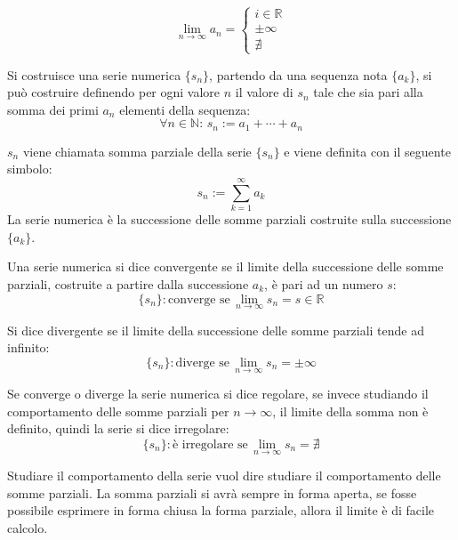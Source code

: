 \documentclass{article}
\numberwithin{equation}{subsection}
\begin{document}
\begin{equation}
    \lim_{n\to\infty}a_n=\begin{cases}
        i\in\mathbb{R}\\
        \pm\infty\\
        \nexists
    \end{cases}
\end{equation}

Si costruisce una serie numerica $\{s_n\}$, partendo da una sequenza nota $\{a_k\}$, si può costruire definendo per ogni valore $n$ il valore di $s_n$ tale che sia pari alla somma dei primi $a_n$ elementi della sequenza:
\begin{equation}
    \forall n\in\mathbb{N}:\,
    s_n:=a_1+\cdots+a_n
\end{equation}

$s_n$ viene chiamata somma parziale della serie $\{s_n\}$ e viene definita con il seguente simbolo:
\begin{equation}
    s_n:=\displaystyle\sum_{k=1}^\infty a_k
\end{equation}
La serie numerica è la successione delle somme parziali costruite sulla successione $\{a_k\}$. 

Una serie numerica si dice convergente se il limite della successione delle somme parziali, costruite a partire dalla successione $a_k$, è pari ad un numero $s$:
\begin{equation}
    \{s_n\}: \mbox{converge se}\,\lim_{n\to\infty}s_n=s\in\mathbb{R}
\end{equation}

Si dice divergente se il limite della successione delle somme parziali tende ad infinito:
\begin{equation}
    \{s_n\}: \mbox{diverge se}\,\lim_{n\to\infty}s_n=\pm\infty
\end{equation}

Se converge o diverge la serie numerica si dice regolare, se invece studiando il comportamento delle somme parziali per $n\to\infty$, il limite della somma non è definito, quindi la serie si dice irregolare:
\begin{equation}
    \{s_n\}: \mbox{è irregolare se}\,\lim_{n\to\infty}s_n=\nexists
\end{equation}

Studiare il comportamento della serie vuol dire studiare il comportamento delle somme parziali. La somma parziali si avrà sempre in forma aperta, se fosse possibile esprimere in forma chiusa la forma parziale, allora il limite è di facile calcolo. 
\end{document}
